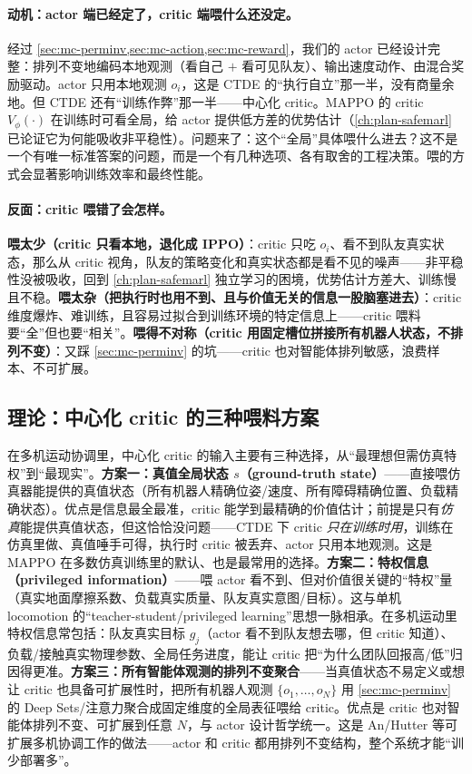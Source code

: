 \paragraph{动机：actor 端已经定了，critic 端喂什么还没定。}
经过 \cref{sec:mc-perminv,sec:mc-action,sec:mc-reward}，我们的 actor 已经设计完整：排列不变地编码本地观测（看自己 $+$ 看可见队友）、输出速度动作、由混合奖励驱动。actor 只用本地观测 $o_i$，这是 CTDE 的“执行自立”那一半，没有商量余地。但 CTDE 还有“训练作弊”那一半——中心化 critic。MAPPO 的 critic $V_\phi(\cdot)$ 在训练时可看全局，给 actor 提供低方差的优势估计（\cref{ch:plan-safemarl} 已论证它为何能吸收非平稳性）。问题来了：这个“全局”具体喂什么进去？这不是一个有唯一标准答案的问题，而是一个有几种选项、各有取舍的工程决策。喂的方式会显著影响训练效率和最终性能。

\paragraph{反面：critic 喂错了会怎样。}
\textbf{喂太少（critic 只看本地，退化成 IPPO）}：critic 只吃 $o_i$、看不到队友真实状态，那么从 critic 视角，队友的策略变化和真实状态都是看不见的噪声——非平稳性没被吸收，回到 \cref{ch:plan-safemarl} 独立学习的困境，优势估计方差大、训练慢且不稳。\textbf{喂太杂（把执行时也用不到、且与价值无关的信息一股脑塞进去）}：critic 维度爆炸、难训练，且容易过拟合到训练环境的特定信息上——critic 喂料要“全”但也要“相关”。\textbf{喂得不对称（critic 用固定槽位拼接所有机器人状态，不排列不变）}：又踩 \cref{sec:mc-perminv} 的坑——critic 也对智能体排列敏感，浪费样本、不可扩展。

\subsection{理论：中心化 critic 的三种喂料方案}
\label{sec:mc-critic-feed}

在多机运动协调里，中心化 critic 的输入主要有三种选择，从“最理想但需仿真特权”到“最现实”。\textbf{方案一：真值全局状态 $s$（ground-truth state）}——直接喂仿真器能提供的真值状态（所有机器人精确位姿/速度、所有障碍精确位置、负载精确状态）。优点是信息最全最准，critic 能学到最精确的价值估计；前提是只有\emph{仿真}能提供真值状态，但这恰恰没问题——CTDE 下 critic \emph{只在训练时用}，训练在仿真里做、真值唾手可得，执行时 critic 被丢弃、actor 只用本地观测。这是 MAPPO 在多数仿真训练里的默认、也是最常用的选择。\textbf{方案二：特权信息（privileged information）}——喂 actor 看不到、但对价值很关键的“特权”量（真实地面摩擦系数、负载真实质量、队友真实意图/目标）。这与单机 locomotion 的“teacher-student/privileged learning”思想一脉相承。在多机运动里特权信息常包括：队友真实目标 $g_j$（actor 看不到队友想去哪，但 critic 知道）、负载/接触真实物理参数、全局任务进度，能让 critic 把“为什么团队回报高/低”归因得更准。\textbf{方案三：所有智能体观测的排列不变聚合}——当真值状态不易定义或想让 critic 也具备可扩展性时，把所有机器人观测 $\{o_1,\dots,o_N\}$ 用 \cref{sec:mc-perminv} 的 Deep Sets/注意力聚合成固定维度的全局表征喂给 critic。优点是 critic 也对智能体排列不变、可扩展到任意 $N$，与 actor 设计哲学统一。这是 An/Hutter 等可扩展多机协调工作的做法\cite{an2024perminv}——actor 和 critic 都用排列不变结构，整个系统才能“训少部署多”。

